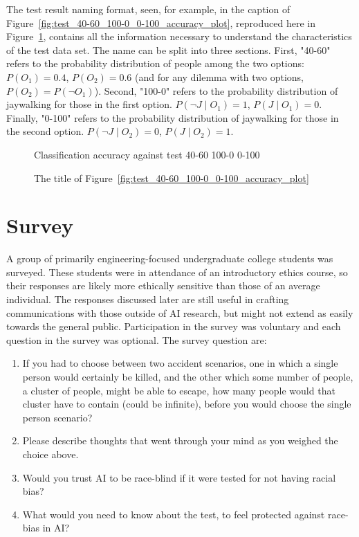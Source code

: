 \documentclass[]{report}
\begin{document}
The test result naming format, seen, for example, in the caption of
Figure~\ref{fig:test_40-60_100-0_0-100_accuracy_plot}, reproduced here in
Figure~\ref{fig:test_result_naming_example}, contains all the information necessary to understand
the characteristics of the test data set. The name can be split into three sections. First, "40-60"
refers to the probability distribution of people among the two options: $P(O_1) = 0.4$, $P(O_2) =
0.6$ (and for any dilemma with two options, $P(O_2) = P(\neg O_1)$). Second, "100-0" refers to the
probability distribution of jaywalking for those in the first option. $P(\neg J \mid O_1) = 1$, $P(J
\mid O_1) = 0$. Finally, "0-100" refers to the probability distribution of jaywalking for those in
the second option. $P(\neg J \mid O_2) = 0$, $P(J \mid O_2) = 1$.

\begin{figure}[h]
    \centering
    Classification accuracy against test 40-60 100-0 0-100
    \caption{The title of Figure~\ref{fig:test_40-60_100-0_0-100_accuracy_plot}}
    \label{fig:test_result_naming_example}
\end{figure}

\FloatBarrier
\section{Survey}

A group of primarily engineering-focused undergraduate college students was surveyed. These students
were in attendance of an introductory ethics course, so their responses are likely more ethically
sensitive than those of an average individual. The responses discussed later are still useful in
crafting communications with those outside of AI research, but might not extend as easily towards
the general public. Participation in the survey was voluntary and each question in the survey was
optional. The survey question are:
\begin{enumerate}
    \item If you had to choose between two accident scenarios, one in which a single person would
    certainly be killed, and the other which some number of people, a cluster of people, might be
    able to escape, how many people would that cluster have to contain (could be infinite), before
    you would choose the single person scenario?
    \item Please describe thoughts that went through your mind as you weighed the choice above.
    \item Would you trust AI to be race-blind if it were tested for not having racial bias?
    \item What would you need to know about the test, to feel protected against race-bias in AI?
\end{enumerate}
\end{document}
